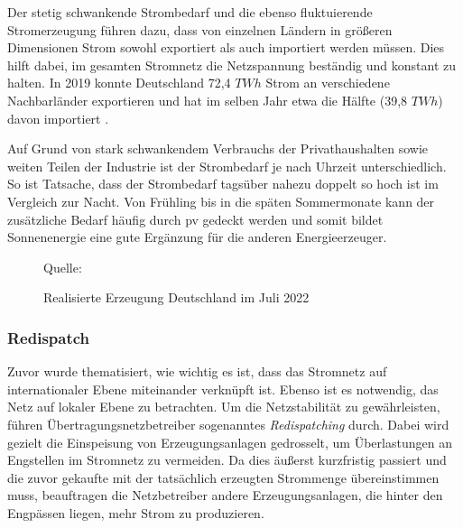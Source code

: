 \documentclass[12pt, a4paper]{article}
\begin{document}
Der stetig schwankende Strombedarf und die ebenso fluktuierende Stromerzeugung führen dazu, dass von einzelnen Ländern in größeren Dimensionen Strom sowohl exportiert als auch importiert werden müssen. Dies hilft dabei, im gesamten Stromnetz die Netzspannung beständig und konstant zu halten. In 2019 konnte Deutschland 72,4 $TWh$ Strom an verschiedene Nachbarländer exportieren und hat im selben Jahr etwa die Hälfte (39,8 $TWh$) davon importiert \cite{ws:bmwk}.

Auf Grund von stark schwankendem Verbrauchs der Privathaushalten sowie weiten Teilen der Industrie ist der Strombedarf je nach Uhrzeit unterschiedlich. So ist Tatsache, dass der Strombedarf tagsüber nahezu doppelt so hoch ist im Vergleich zur Nacht. Von Frühling bis in die späten Sommermonate kann der zusätzliche Bedarf häufig durch \ac{pv} gedeckt werden und somit bildet Sonnenenergie eine gute Ergänzung für die anderen Energieerzeuger. 


\begin{figure}
\centering
\def\svgwidth{450pt}
\fontsize{7}{10}\selectfont

\captionsetup{justification=raggedleft,singlelinecheck=false,skip=0pt}\caption*{\scriptsize{Quelle: \cite{ws:smard}}}
\captionsetup{justification=centering,singlelinecheck=false,skip=25pt}
\caption{Realisierte Erzeugung Deutschland im Juli 2022}
\label{fig:stromerzeugung_de_mai}
\end {figure}

\subsubsection{Redispatch}

Zuvor wurde thematisiert, wie wichtig es ist, dass das Stromnetz auf internationaler Ebene miteinander verknüpft ist. Ebenso ist es notwendig, das Netz auf lokaler Ebene zu betrachten. Um die Netzstabilität zu gewährleisten, führen Übertragungsnetzbetreiber sogenanntes \textit{Redispatching} durch. Dabei wird gezielt die Einspeisung von Erzeugungsanlagen gedrosselt, um Überlastungen an Engstellen im Stromnetz zu vermeiden. Da dies äußerst kurzfristig passiert und die zuvor gekaufte mit der tatsächlich erzeugten Strommenge übereinstimmen muss, beauftragen die Netzbetreiber andere Erzeugungsanlagen, die hinter den Engpässen liegen, mehr Strom zu produzieren.
\end{document}

